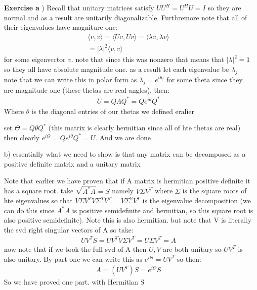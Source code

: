 \documentclass[12pt]{article}
\newenvironment{exercise}[1]{\vspace{.1in}\noindent\textbf{Exercise #1 \hspace{.05em}}}{}
\theoremstyle{definition}
\theoremstyle{remark}
\begin{document}
\begin{exercise}{4}

	a)
	Recall that unitary matrices satisfy $UU^H=U^HU=I$ so they are normal and as a result are unitarily diagonalizable. Furthremore note that all of their eigenvalues have magniture one:
	\begin{align}
		\langle v, v\rangle =\langle Uv, Uv\rangle =\langle \lambda v, \lambda v\rangle \\
		=|\lambda|^2 \langle v, v\rangle
	\end{align}
	for some eigenvector $v$. note that since this was nonzero that means that $|\lambda|^2=1$ so they all have absolute magnitude one. as a result let each eigenvalue be $\lambda_j$ note that we can write this in polar form as $\lambda_j=e^{i \theta_j}$ for some theta since they are magnitude one (these thetas are real angles). then:
	\begin{align}
		U=Q\Lambda Q^{*}=Qe^{i\theta}Q^*
	\end{align}
	Where $\theta$ is the diagonal entries of our thetas we defined eralier

	set $\Theta= Q\theta Q^*$ (this matrix is clearly hermitian since all of hte thetas are real) then clearly $e^{i\Theta}=Qe^{i\theta}Q^*=U$. And we are done

	b) essentially what we need to show is that any matrix can be decomposed as a positive definite matrix and a unitary matrix

	Note that earlier we have proven that if A matrix is hermitian positive definite it has a square root. take $\sqrt{A^*A}=S$ namely $V\Sigma V^T$ where $\Sigma$ is the square roots of hte eigenvalues so that $V\Sigma V^TV\Sigma^T V^T=V\Sigma^2V^T$ is the eigenvalue decomposition (we can do this since $A^*A$ is positive semidefinite and hermitian, so this square root is also positive semidefinite). Note this is also hermitian. but note that V is literally the svd right singular vectors of A so take:
	\begin{align}
		UV^TS=UV^TV\Sigma V^T=U\Sigma V^T=A
	\end{align}
	now note that if we took the full svd of A then $U,V$ are both unitary so $UV^T$ is also unitary. By part one we can write this as $e^{i\Theta}=UV^T$ so then:
	\begin{align}
		A=(UV^T)S=e^{i\Theta}S
	\end{align}
	So we have proved one part. with Hermitian S



\end{exercise}
\end{document}

